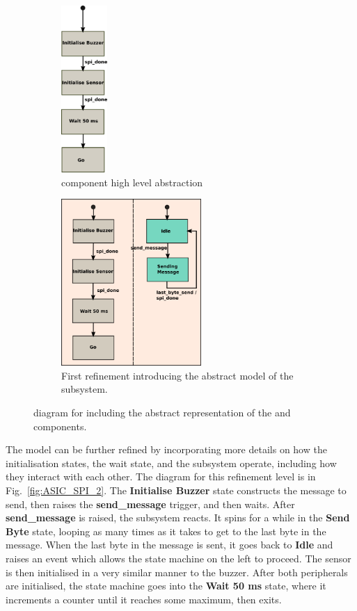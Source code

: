 \begin{figure}[!tb]\centering
	    \begin{subfigure}[t]{0.3\textwidth}
	        \begin{centering}
	        \includegraphics[height=2.5in]{figures/ASIC}
	        \caption{\ASIC component high level abstraction}
	        \label{fig:ASIC}
	        \end{centering}
	    \end{subfigure}
\qquad
	    \begin{subfigure}[t]{0.5\textwidth}
	        \includegraphics[height=2.5in]{figures/ASIC&SPI_1}
	        \caption{First refinement introducing the abstract model of the \SPI subsystem.}
	        \label{fig:ASIC_SPI_1}
	    \end{subfigure}
	    \caption{\Statechart diagram for \IDS including the abstract representation of the \ASIC and \SPI components.}
\end{figure}

The model can be further refined by incorporating more details on how the initialisation states, the wait state, and the \SPI subsystem operate, including how they interact with each other. The \statechart diagram for this refinement level is in Fig.~\ref{fig:ASIC_SPI_2}. The \textbf{Initialise Buzzer} state constructs the \SPI message to send, then raises the \textbf{send\_message} trigger, and then waits.
After \textbf{send\_message} is raised, the \SPI subsystem reacts. It spins for a while in the \textbf{Send Byte} state, looping as many times as it takes to get to the last byte in the message. When the last byte in the message is sent, it goes back to \textbf{Idle} and raises an event which allows the state machine on the left to proceed. The sensor is then initialised in a very similar manner to the buzzer. After both peripherals are initialised, the state machine goes into the \textbf{Wait 50 ms} state, where it increments a counter until it reaches some maximum, then exits.

